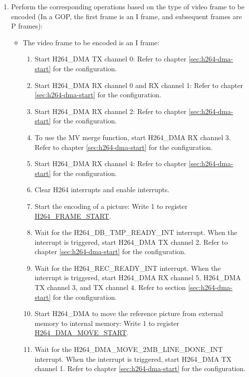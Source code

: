 \documentclass[main\_\_EN.tex]{subfiles}
\begin{document}
\begin{enumerate}
\begin{enumerate}
        \item To use the MV merge function, configure its related registers referring to the description in section \ref{sec:h264-mv-merge}.
    \end{enumerate}
    \item\label{item:h264-gop-frame} Perform the corresponding operations based on the type of video frame to be encoded (In a GOP, the first frame is an I frame, and subsequent frames are P frames):
    \begin{itemize}
        \item The video frame to be encoded is an I frame:
        \begin{enumerate}
            \item Start H264\_DMA TX channel 0: Refer to chapter \ref{sec:h264-dma-start} for the configuration.
            \item Start H264\_DMA RX channel 0 and RX channel 1: Refer to chapter \ref{sec:h264-dma-start} for the configuration.
            \item Start H264\_DMA RX channel 2: Refer to chapter \ref{sec:h264-dma-start} for the configuration.
            \item To use the MV merge function, start H264\_DMA RX channel 3. Refer to chapter \ref{sec:h264-dma-start} for the configuration.
            \item Start H264\_DMA RX channel 4: Refer to chapter \ref{sec:h264-dma-start} for the configuration.
            \item Clear H264 interrupts and enable interrupts.
            \item Start the encoding of a picture: Write 1 to register \hyperref[fielddesc:H264FRAMESTART]{H264\_FRAME\_START}.
            \item Wait for the H264\_DB\_TMP\_READY\_INT interrupt. When the interrupt is triggered, start H264\_DMA TX channel 2. Refer to chapter \ref{sec:h264-dma-start} for the configuration.
            \item Wait for the H264\_REC\_READY\_INT interrupt. When the interrupt is triggered, start H264\_DMA RX channel 5, H264\_DMA TX channel 3, and TX channel 4. Refer to section \ref{sec:h264-dma-start} for the configuration.
            \item Start H264\_DMA to move the reference picture from external memory to internal memory: Write 1 to register \hyperref[fielddesc:H264DMAMOVESTART]{H264\_DMA\_MOVE\_START}.
            \item Wait for the H264\_DMA\_MOVE\_2MB\_LINE\_DONE\_INT interrupt. When the interrupt is triggered, start H264\_DMA TX channel 1. Refer to chapter \ref{sec:h264-dma-start} for the configuration.

\end{enumerate}
\end{itemize}
\end{enumerate}
\end{document}
